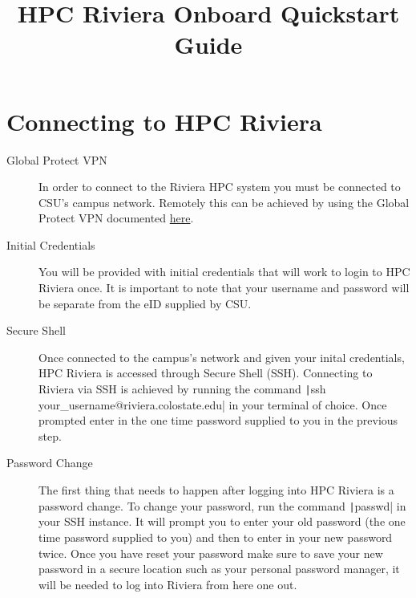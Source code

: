 \documentclass[11pt,letterpaper]{article}
\title{HPC Riviera Onboard Quickstart Guide}
\begin{document}
\startdoc

\section{Connecting to HPC Riviera}

\begin{description}
    \item[Global Protect VPN] In order to connect to the Riviera HPC system you must be connected to CSU's campus network. Remotely this can be achieved by using the Global Protect VPN documented \href{https://csusystem.freshservice.com/support/solutions/folders/23000047198}{here}.
    \item[Initial Credentials] You will be provided with initial credentials that will work to login to HPC Riviera once. It is important to note that your username and password will be separate from the eID supplied by CSU.
    \item[Secure Shell] Once connected to the campus's network and given your inital credentials, HPC Riviera is accessed through Secure Shell (SSH). Connecting to Riviera via SSH is achieved by running the command \texttt|ssh your_username@riviera.colostate.edu| in your terminal of choice. Once prompted enter in the one time password supplied to you in the previous step.
    \item[Password Change] The first thing that needs to happen after logging into HPC Riviera is a password change. To change your password, run the command \texttt|passwd| in your SSH instance. It will prompt you to enter your old password (the one time password supplied to you) and then to enter in your new password twice. Once you have reset your password make sure to save your new password in a secure location such as your personal password manager, it will be needed to log into Riviera from here one out.
\end{description}
\end{document}
